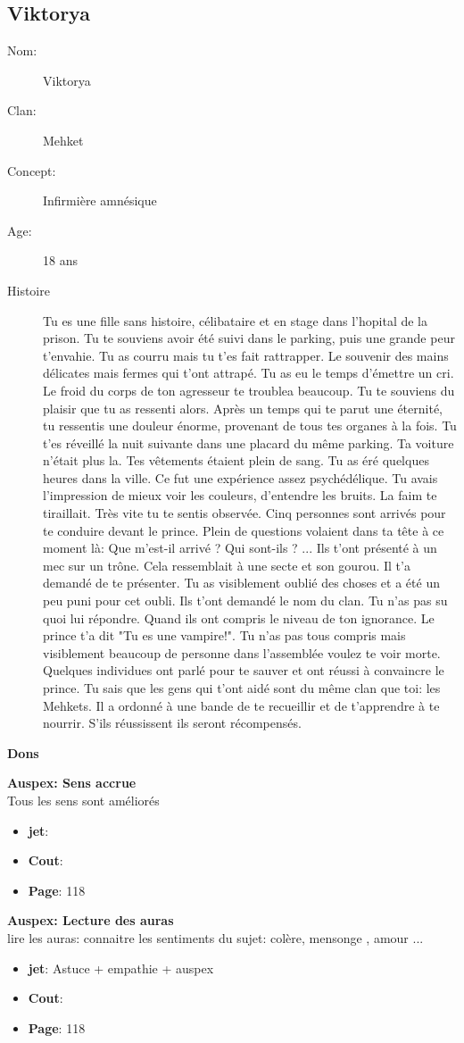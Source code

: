 \documentclass[oneside,12pt]{book}
\newcommand\don[5]{
\textbf{#1} \\
#2
\begin{itemize}
\item{ \textbf{jet}: #3}
\item{ \textbf{Cout}: #4}
\item{ \textbf{Page}: #5}
\end{itemize}
\vspace{0.5cm}
}
\begin{document}
\begin{flushleft}
\section{Viktorya}
\begin{description}
\item[Nom:]{Viktorya}
\item[Clan:]{Mehket}
\item[Concept:]{Infirmière amnésique}
\item[Age:]{18 ans}
\item[Histoire]{
Tu es une fille sans histoire, célibataire et en stage dans l'hopital de la prison. Tu te souviens avoir été suivi dans le parking, puis une grande peur t'envahie. Tu as courru mais tu t'es fait rattrapper.
Le souvenir des mains délicates mais fermes qui t'ont attrapé. Tu as eu le temps d'émettre un cri.
Le froid du corps de ton agresseur te troublea beaucoup. Tu te souviens du plaisir que tu as ressenti alors.
Après un temps qui te parut une éternité, tu ressentis une douleur énorme, provenant de tous tes organes à la fois.
Tu t'es réveillé la nuit suivante dans une placard du même parking.
Ta voiture n'était plus la. Tes vêtements étaient plein de sang.
Tu as éré quelques heures dans la ville. Ce fut une expérience assez psychédélique.
Tu avais l'impression de mieux voir les couleurs, d'entendre les bruits. La faim te tiraillait.
Très vite tu te sentis observée. Cinq personnes sont arrivés pour te conduire devant le prince.
Plein de questions volaient dans ta tête à ce moment là: Que m'est-il arrivé ? Qui sont-ils ? ...
Ils t'ont présenté à un mec sur un trône. Cela ressemblait à une secte et son gourou.
Il t'a demandé de te présenter.
Tu as visiblement oublié des choses et a été un peu puni pour cet oubli. Ils t'ont demandé le nom du clan.
Tu n'as pas su quoi lui répondre.
Quand ils ont compris le niveau de ton ignorance. Le prince t'a dit "Tu es une vampire!".
Tu n'as pas tous compris mais visiblement beaucoup de personne dans l'assemblée voulez te voir morte.
Quelques individues ont parlé pour te sauver et ont réussi à convaincre le prince.
Tu sais que les gens qui t'ont aidé sont du même clan que toi: les Mehkets.
Il a ordonné à une bande de te recueillir et de t'apprendre à te nourrir. S'ils réussissent ils seront récompensés.
}
\end{description}
 
\clearpage
\textbf{\large Dons}
\vspace{0.5cm}

\don{Auspex: Sens accrue}{Tous les sens sont améliorés }{}{}{118}
\don{Auspex: Lecture des auras}{lire les auras: connaitre les sentiments du sujet: colère, mensonge , amour ...}{Astuce + empathie + auspex}{}{118}



\end{flushleft}
\end{document}
